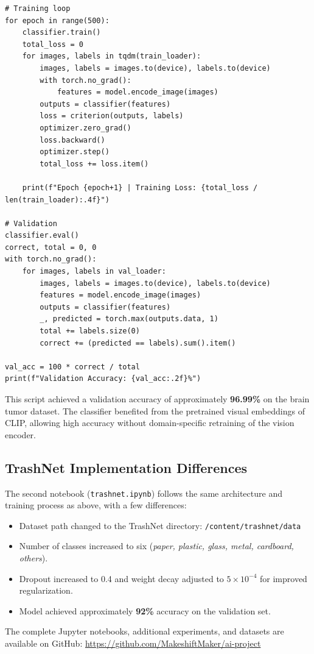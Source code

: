 \documentclass[12pt]{article}
\begin{document}
\begin{lstlisting}[style=pythonstyle, caption={Brain Tumor Detection Model (CLIP ViT-B/32)}]
# Training loop
for epoch in range(500):
    classifier.train()
    total_loss = 0
    for images, labels in tqdm(train_loader):
        images, labels = images.to(device), labels.to(device)
        with torch.no_grad():
            features = model.encode_image(images)
        outputs = classifier(features)
        loss = criterion(outputs, labels)
        optimizer.zero_grad()
        loss.backward()
        optimizer.step()
        total_loss += loss.item()

    print(f"Epoch {epoch+1} | Training Loss: {total_loss / len(train_loader):.4f}")

# Validation
classifier.eval()
correct, total = 0, 0
with torch.no_grad():
    for images, labels in val_loader:
        images, labels = images.to(device), labels.to(device)
        features = model.encode_image(images)
        outputs = classifier(features)
        _, predicted = torch.max(outputs.data, 1)
        total += labels.size(0)
        correct += (predicted == labels).sum().item()

val_acc = 100 * correct / total
print(f"Validation Accuracy: {val_acc:.2f}%")
\end{lstlisting}

\vspace{1em}
This script achieved a validation accuracy of approximately \textbf{96.99\%} on the brain tumor dataset.  
The classifier benefited from the pretrained visual embeddings of CLIP, allowing high accuracy without domain-specific retraining of the vision encoder.

\subsection*{TrashNet Implementation Differences}
The second notebook (\texttt{trashnet.ipynb}) follows the same architecture and training process as above, with a few differences:
\begin{itemize}
    \item Dataset path changed to the TrashNet directory:  
    \texttt{/content/trashnet/data}
    \item Number of classes increased to six (\textit{paper, plastic, glass, metal, cardboard, others}).
    \item Dropout increased to 0.4 and weight decay adjusted to $5\times10^{-4}$ for improved regularization.
    \item Model achieved approximately \textbf{92\%} accuracy on the validation set.
\end{itemize}

\vspace{1em}
\noindent
The complete Jupyter notebooks, additional experiments, and datasets are available on GitHub:  
\url{https://github.com/MakeshiftMaker/ai-project}
\end{document}
